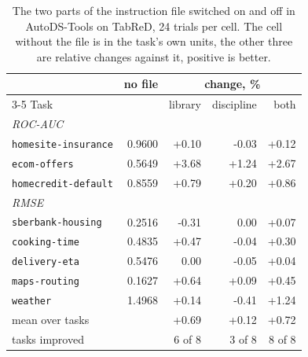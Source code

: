 \begin{table}[t]
\centering
\caption{The two parts of the instruction file switched on and off in AutoDS-Tools on TabReD, 24 trials per cell. The cell without the file is in the task's own units, the other three are relative changes against it, positive is better.}
\label{tab:grid}
\footnotesize
\setlength{\tabcolsep}{3.5pt}
\begin{tabular}{lrrrr}
\toprule
 & no file & \multicolumn{3}{c}{change, \%} \\
\cmidrule(l){3-5}
Task & & library & discipline & both \\
\midrule
\multicolumn{5}{l}{\itshape ROC-AUC} \\
\texttt{homesite-insurance} & 0.9600 & +0.10 & -0.03 & +0.12 \\
\texttt{ecom-offers} & 0.5649 & +3.68 & +1.24 & +2.67 \\
\texttt{homecredit-default} & 0.8559 & +0.79 & +0.20 & +0.86 \\
\multicolumn{5}{l}{\itshape RMSE} \\
\texttt{sberbank-housing} & 0.2516 & -0.31 & 0.00 & +0.07 \\
\texttt{cooking-time} & 0.4835 & +0.47 & -0.04 & +0.30 \\
\texttt{delivery-eta} & 0.5476 & 0.00 & -0.05 & +0.04 \\
\texttt{maps-routing} & 0.1627 & +0.64 & +0.09 & +0.45 \\
\texttt{weather} & 1.4968 & +0.14 & -0.41 & +1.24 \\
\midrule
mean over tasks & & +0.69 & +0.12 & +0.72 \\
tasks improved & & 6 of 8 & 3 of 8 & 8 of 8 \\
\bottomrule
\end{tabular}
\end{table}
